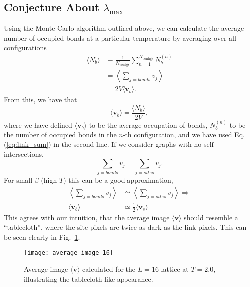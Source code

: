 \documentclass[../main.tex]{subfiles}
\begin{document}
\subsection{Conjecture About \texorpdfstring{$\lambda_{\max}$}{λmax}}%
\label{ssec:conjecture}
Using the Monte Carlo algorithm outlined above, we can calculate the average
number of occupied bonds at a particular temperature by averaging over all
configurations
%
\begin{align}
    \langle N_b\rangle
        &\equiv \frac{1}{N_{\mathrm{configs}}}\sum_{n=1}^{N_{\mathrm{\mathrm{configs}}}} N_b^{(n)}\\
        &= \left\langle \sum_{j=bonds} v_j \right\rangle \\
        &= 2V\langle \mathbf{v}_b\rangle.
    \label{eq:link_avg}
\end{align}
%
From this, we have that
%
\begin{equation}
    \langle \mathbf{v}_b\rangle = \frac{\langle N_b\rangle}{2V},
\end{equation}
%
where we have defined $\langle \mathbf{v}_b\rangle$ to be the average
occupation of bonds, $N_b^{(n)}$ to be the number of occupied bonds in the
$n$-th configuration, and we have used Eq. (\ref{eq:link_sum}) in the second
line.
%
If we consider graphs with no self-intersections,
%
\begin{equation}
    \sum_{j=bonds} v_j = \sum_{j=sites} v_j.
    \label{bonds_equal_sites}
\end{equation}
%
For small $\beta$ (high $T$) this can be a good approximation,
%
\begin{align}
    \left\langle \sum_{j=bonds} v_j \right\rangle &\simeq \left\langle
    \sum_{j=sites} v_j\right\rangle\Longrightarrow\\
    \langle\mathbf{v}_b\rangle &\simeq \frac{1}{2}\langle\mathbf{v}_s\rangle
    \label{avg_bonds_equal_sites}
\end{align}
%
This agrees with our intuition, that the average image $\langle
\mathbf{v}\rangle$ should resemble a ``tablecloth'', where the site pixels are
twice as dark as the link pixels.
%
This can be seen clearly in Fig.~\ref{fig:average_image}.
%
\begin{figure}[htpb]
    \centering
    \texttt{[image: average\_image\_16]}
    \caption{Average image $\langle \mathbf{v}\rangle$ calculated for the
        $L = 16$ lattice at $T = 2.0$, illustrating the
        tablecloth-like appearance.}%
\label{fig:average_image}
\end{figure}
\end{document}
